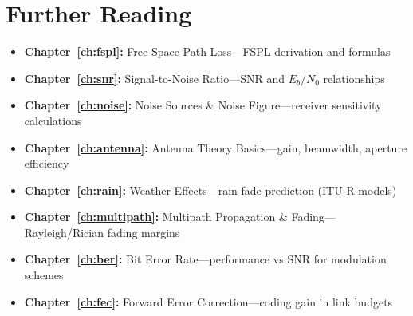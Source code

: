 \section{Further Reading}

\begin{itemize}
\item \textbf{Chapter~\ref{ch:fspl}:} Free-Space Path Loss---FSPL derivation and formulas
\item \textbf{Chapter~\ref{ch:snr}:} Signal-to-Noise Ratio---SNR and $E_b/N_0$ relationships
\item \textbf{Chapter~\ref{ch:noise}:} Noise Sources \& Noise Figure---receiver sensitivity calculations
\item \textbf{Chapter~\ref{ch:antenna}:} Antenna Theory Basics---gain, beamwidth, aperture efficiency
\item \textbf{Chapter~\ref{ch:rain}:} Weather Effects---rain fade prediction (ITU-R models)
\item \textbf{Chapter~\ref{ch:multipath}:} Multipath Propagation \& Fading---Rayleigh/Rician fading margins
\item \textbf{Chapter~\ref{ch:ber}:} Bit Error Rate---performance vs SNR for modulation schemes
\item \textbf{Chapter~\ref{ch:fec}:} Forward Error Correction---coding gain in link budgets
\end{itemize}
